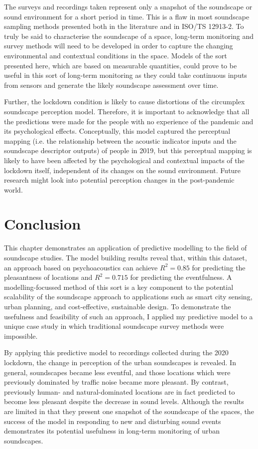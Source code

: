    The surveys and recordings taken represent only a snapshot of the soundscape or sound environment for a short period in time. This is a flaw in most soundscape sampling methods presented both in the literature and in ISO/TS 12913-2. To truly be said to characterise the soundscape of a space, long-term monitoring and survey methods will need to be developed in order to capture the changing environmental and contextual conditions in the space. Models of the sort presented here, which are based on measurable quantities, could prove to be useful in this sort of long-term monitoring as they could take continuous inputs from sensors and generate the likely soundscape assessment over time.

   Further, the lockdown condition is likely to cause distortions of the circumplex soundscape perception model. Therefore, it is important to acknowledge that all the predictions were made for the people with no experience of the pandemic and its psychological effects. Conceptually, this model captured the perceptual mapping (i.e. the relationship between the acoustic indicator inputs and the soundscape descriptor outputs) of people in 2019, but this perceptual mapping is likely to have been affected by the psychological and contextual impacts of the lockdown itself, independent of its changes on the sound environment. Future research might look into potential perception changes in the post-pandemic world.


\section{Conclusion}

 This chapter demonstrates an application of predictive modelling to the field of soundscape studies. The model building results reveal that, within this dataset, an approach based on psychoacoustics can achieve $R^2=0.85$ for predicting the pleasantness of locations and $R^2=0.715$ for predicting the eventfulness. A modelling-focussed method of this sort is a key component to the potential scalability of the soundscape approach to applications such as smart city sensing, urban planning, and cost-effective, sustainable design. To demonstrate the usefulness and feasibility of such an approach, I applied my predictive model to a unique case study in which traditional soundscape survey methods were impossible.

 By applying this predictive model to recordings collected during the 2020 lockdown, the change in perception of the urban soundscapes is revealed. In general, soundscapes became less eventful, and those locations which were previously dominated by traffic noise became more pleasant. By contrast, previously human- and natural-dominated locations are in fact predicted to become less pleasant despite the decrease in sound levels. Although the results are limited in that they present one snapshot of the soundscape of the spaces, the success of the model in responding to new and disturbing sound events demonstrates its potential usefulness in long-term monitoring of urban soundscapes.

